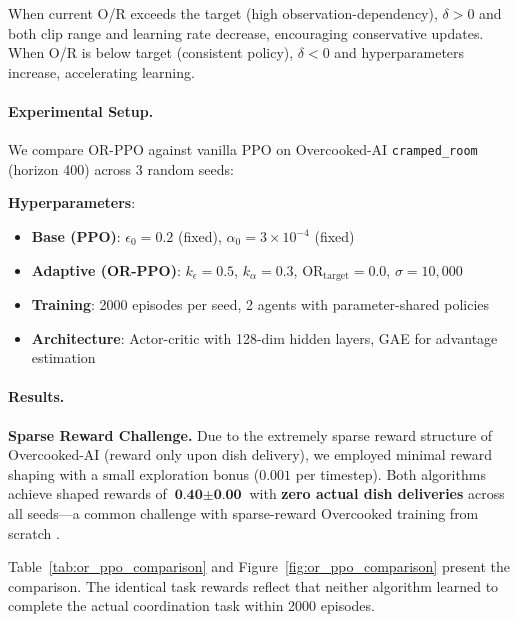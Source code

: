 When current O/R exceeds the target (high observation-dependency), $\delta > 0$ and both clip range and learning rate decrease, encouraging conservative updates. When O/R is below target (consistent policy), $\delta < 0$ and hyperparameters increase, accelerating learning.

\paragraph{Experimental Setup.}

We compare OR-PPO against vanilla PPO on Overcooked-AI \texttt{cramped\_room} (horizon 400) across 3 random seeds:

\textbf{Hyperparameters}:
\begin{itemize}
    \item \textbf{Base (PPO)}: $\epsilon_0 = 0.2$ (fixed), $\alpha_0 = 3 \times 10^{-4}$ (fixed)
    \item \textbf{Adaptive (OR-PPO)}: $k_\epsilon = 0.5$, $k_\alpha = 0.3$, $\text{OR}_{\text{target}} = 0.0$, $\sigma = 10{,}000$
    \item \textbf{Training}: 2000 episodes per seed, 2 agents with parameter-shared policies
    \item \textbf{Architecture}: Actor-critic with 128-dim hidden layers, GAE for advantage estimation
\end{itemize}

\paragraph{Results.}


\textbf{Sparse Reward Challenge.} Due to the extremely sparse reward structure of Overcooked-AI (reward only upon dish delivery), we employed minimal reward shaping with a small exploration bonus ($0.001$ per timestep). Both algorithms achieve shaped rewards of $\textbf{0.40} \pm \textbf{0.00}$ with \textbf{zero actual dish deliveries} across all seeds---a common challenge with sparse-reward Overcooked training from scratch \citep{carroll2019utility}.

Table~\ref{tab:or_ppo_comparison} and Figure~\ref{fig:or_ppo_comparison} present the comparison. The identical task rewards reflect that neither algorithm learned to complete the actual coordination task within 2000 episodes.


